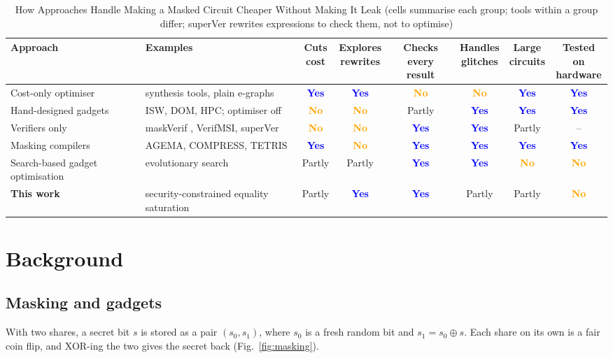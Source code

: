 \documentclass[conference]{IEEEtran}
\newcommand{\yes}{\textcolor{blue}{\textbf{Yes}}}
\newcommand{\no}{\textcolor{orange}{\textbf{No}}}
\newcommand{\partly}{\textcolor{muted}{Partly}}
\begin{document}
\begin{table}[t]
\caption{How Approaches Handle Making a Masked Circuit Cheaper Without Making It Leak (cells summarise each group; tools within a group differ; superVer rewrites expressions to check them, not to optimise)}\label{tab:compare}
\centering\footnotesize
\setlength{\tabcolsep}{5pt}
\begin{tabularx}{\textwidth}{@{}l>{\raggedright\arraybackslash}Xcccccc@{}}
\toprule
Approach & Examples & \makecell{Cuts\\cost} & \makecell{Explores\\rewrites} & \makecell{Checks every\\result} & \makecell{Handles\\glitches} & \makecell{Large\\circuits} & \makecell{Tested on\\hardware}\\\midrule
Cost-only optimiser & synthesis tools, plain e-graphs & \yes & \yes & \no & \no & \yes & \yes\\
Hand-designed gadgets & ISW, DOM, HPC; optimiser off & \no & \no & \partly & \yes & \yes & \yes\\
Verifiers only & maskVerif \cite{barthe2019maskverif}, VerifMSI, superVer & \no & \no & \yes & \yes & \partly & --\\
Masking compilers & AGEMA, COMPRESS, TETRIS & \yes & \no & \yes & \yes & \yes & \yes\\
Search-based gadget optimisation & evolutionary search \cite{koblah2025evo} & \partly & \partly & \yes & \yes & \no & \no\\
\rowcolor{tint}\textbf{This work} & security-constrained equality saturation & \partly & \yes & \yes & \partly & \partly & \no\\
\bottomrule
\end{tabularx}
\end{table}

\section{Background}
\subsection{Masking and gadgets}
With two shares, a secret bit $s$ is stored as a pair $(s_0,s_1)$, where $s_0$ is a fresh random bit and $s_1=s_0\oplus s$. Each share on its own is a fair coin flip, and XOR-ing the two gives the secret back (Fig.~\ref{fig:masking}).
\end{document}
